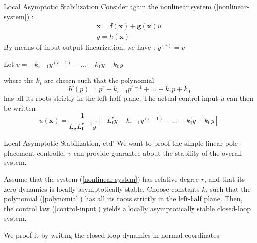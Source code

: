 \documentclass{beamer}
\renewcommand{\vec}[1]{\ensuremath{\boldsymbol{#1}}} %
\begin{document}
\begin{frame}{Local Asymptotic Stabilization}
    Consider again the nonlinear system (\ref{nonlinear-system}) :
    \begin{equation}\label{nonlinear-system-2}\nonumber
        \begin{array}{l}{\dot{\vec{x}}=\vec{f}(\vec{x})+\vec{g}(\vec{x}) u} \\ {y=h(\vec{x})}\end{array}
    \end{equation}
    By means of input-output linearization, we have : {\color{red}$y^{(r)}=v$}

    Let \quad $v=-k_{r-1}y^{(r-1)} - \ldots -k_{1}\dot{y} - k_{0}y$

    where the $k_{i}$ are chosen such that the polynomial
    \begin{equation}\label{polynomial}
      K(p) = p^{r}+k_{r-1}p^{r-1}+\dots+k_{1}p+k_{0}
    \end{equation}
    has all its roots strictly in the {\color{red}left-half plane}. The actual control input $u$ can then be written
    \begin{equation}\label{control-input}
      u(\vec{x})=\frac{1}{L_{\vec{g}} L_{\vec{f}}^{r-1} y}\left[-L_{\vec{f}}^{r} y-k_{r-1} y^{(r-1)}-\ldots-k_{1} \dot{y}-k_{0} y\right]
    \end{equation}
\end{frame}


\begin{frame}{Local Asymptotic Stabilization, ctd'}
    We want to proof the simple {\color{red}linear pole-placement controller $v$} can provide guarantee about the stability of the overall system.
    \begin{theorem}[6.3]
      Assume that the system (\ref{nonlinear-system}) has relative degree $r$, and that its zero-dynamics is {\color{red}locally asymptotically stable}. Choose constants $k_{i}$ such that the polynomial (\ref{polynomial}) has all its roots strictly in the {\color{red}left-half plane}. Then, the control law (\ref{control-input}) yields a {\color{red}locally asymptotically stable closed-loop system}.
    \end{theorem}

    We proof it by writing the closed-loop dynamics in normal coordinates
\end{frame}
\end{document}
